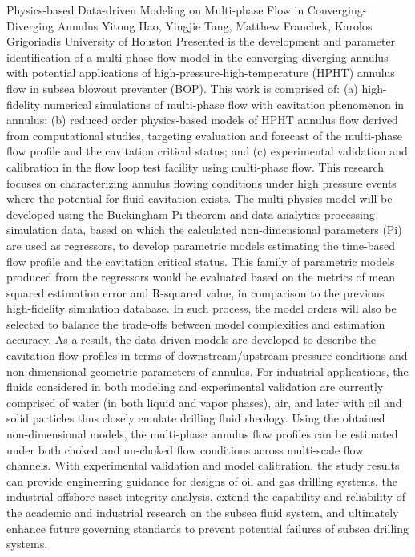 \begin{addmargin}[2em]{0em}
\vspace{1.5ex}
\abs
{Physics-based Data-driven Modeling on Multi-phase Flow in Converging-Diverging Annulus}
{Yitong Hao, Yingjie Tang, Matthew Franchek, Karolos Grigoriadis}
{University of Houston}
{Presented is the development and parameter identification of a multi-phase flow model in the converging-diverging annulus with potential applications of high-pressure-high-temperature (HPHT) annulus flow in subsea blowout preventer (BOP). This work is comprised of: (a) high-fidelity numerical simulations of multi-phase flow with cavitation phenomenon in annulus; (b) reduced order physics-based models of HPHT annulus flow derived from computational studies, targeting evaluation and forecast of the multi-phase flow profile and the cavitation critical status; and (c) experimental validation and calibration in the flow loop test facility using multi-phase flow. This research focuses on characterizing annulus flowing conditions under high pressure events where the potential for fluid cavitation exists. The multi-physics model will be developed using the Buckingham Pi theorem and data analytics processing simulation data, based on which the calculated non-dimensional parameters (Pi) are used as regressors, to develop parametric models estimating the time-based flow profile and the cavitation critical status. This family of parametric models produced from the regressors would be evaluated based on the metrics of mean squared estimation error and R-squared value, in comparison to the previous high-fidelity simulation database. In such process, the model orders will also be selected to balance the trade-offs between model complexities and estimation accuracy. As a result, the data-driven models are developed to describe the cavitation flow profiles in terms of downstream/upstream pressure conditions and non-dimensional geometric parameters of annulus. For industrial applications, the fluids considered in both modeling and experimental validation are currently comprised of water (in both liquid and vapor phases), air, and later with oil and solid particles thus closely emulate drilling fluid rheology.
Using the obtained non-dimensional models, the multi-phase annulus flow profiles can be estimated under both choked and un-choked flow conditions across multi-scale flow channels. With experimental validation and model calibration, the study results can provide engineering guidance for designs of oil and gas drilling systems, the industrial offshore asset integrity analysis, extend the capability and reliability of the academic and industrial research on the subsea fluid system, and ultimately enhance future governing standards to prevent potential failures of subsea drilling systems.    }


\end{addmargin}
